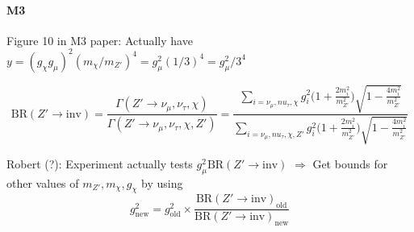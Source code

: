 \documentclass[a4paper, 12pt]{article}
\begin{document}
\paragraph{M3}
Figure 10 in M3 paper: Actually have $y = (g_\chi g_\mu )^2 (m_\chi / m_{Z'})^4 = g_\mu^2 (1/3)^4 = g_\mu^2 /3^4$

$$\text{BR} (Z'\to \text{inv}) = \frac{\Gamma (Z'\to \nu_\mu, \nu_\tau, \chi)}{\Gamma(Z'\to \nu_\mu, \nu_\tau, \chi, Z')}= \frac{\sum_{i=\nu_\mu, nu_\tau, \chi} g_i^2 \Big( 1+\frac{2m_i^2}{m_{Z'}^2}\Big) \sqrt{1-\frac{4m_i^2}{m_{Z'}^2}}}{\sum_{i=\nu_\mu, nu_\tau, \chi, Z'} g_i^2 \Big( 1+\frac{2m_i^2}{m_{Z'}^2}\Big) \sqrt{1-\frac{4m_i^2}{m_{Z'}^2}}}$$

Robert (?): Experiment actually tests $g_\mu^2 \text{BR}(Z'\to \text{inv})$ $\Rightarrow$ Get bounds for other values of $m_{Z'}, m_\chi, g_\chi$ by using
$$g_\text{new}^2 = g_\text{old}^2 \times \frac{\text{BR}(Z'\to \text{inv})_\text{old}}{\text{BR}(Z'\to \text{inv})_\text{new}}$$
\end{document}

